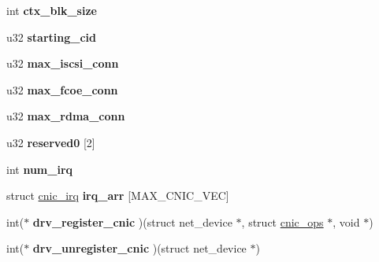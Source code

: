 \begin{DoxyCompactItemize}
\item 
\hypertarget{structcnic__eth__dev_a6cc08b64306a17888ab21e0898906372}{
int {\bfseries ctx\_\-blk\_\-size}}
\label{structcnic__eth__dev_a6cc08b64306a17888ab21e0898906372}

\item 
\hypertarget{structcnic__eth__dev_ada29383addcd6e47b8eb7660b0023e0b}{
u32 {\bfseries starting\_\-cid}}
\label{structcnic__eth__dev_ada29383addcd6e47b8eb7660b0023e0b}

\item 
\hypertarget{structcnic__eth__dev_a3b0c95fcc6e8b2b0db396239f2a8db26}{
u32 {\bfseries max\_\-iscsi\_\-conn}}
\label{structcnic__eth__dev_a3b0c95fcc6e8b2b0db396239f2a8db26}

\item 
\hypertarget{structcnic__eth__dev_a9dc0a53db604b6157ac246496273fb7d}{
u32 {\bfseries max\_\-fcoe\_\-conn}}
\label{structcnic__eth__dev_a9dc0a53db604b6157ac246496273fb7d}

\item 
\hypertarget{structcnic__eth__dev_a77a6c056d37112a0f83685d6c231c4eb}{
u32 {\bfseries max\_\-rdma\_\-conn}}
\label{structcnic__eth__dev_a77a6c056d37112a0f83685d6c231c4eb}

\item 
\hypertarget{structcnic__eth__dev_a4db0f8d66dc036f46839b0fec5dbe152}{
u32 {\bfseries reserved0} \mbox{[}2\mbox{]}}
\label{structcnic__eth__dev_a4db0f8d66dc036f46839b0fec5dbe152}

\item 
\hypertarget{structcnic__eth__dev_a839d8bc1c19f98b77a924e6d3402f71f}{
int {\bfseries num\_\-irq}}
\label{structcnic__eth__dev_a839d8bc1c19f98b77a924e6d3402f71f}

\item 
\hypertarget{structcnic__eth__dev_a7c4228d03b855d4073a110897f7a54b0}{
struct \hyperlink{structcnic__irq}{cnic\_\-irq} {\bfseries irq\_\-arr} \mbox{[}MAX\_\-CNIC\_\-VEC\mbox{]}}
\label{structcnic__eth__dev_a7c4228d03b855d4073a110897f7a54b0}

\item 
\hypertarget{structcnic__eth__dev_a8011d726c29bd4ac57f1737ea5c5facf}{
int($\ast$ {\bfseries drv\_\-register\_\-cnic} )(struct net\_\-device $\ast$, struct \hyperlink{structcnic__ops}{cnic\_\-ops} $\ast$, void $\ast$)}
\label{structcnic__eth__dev_a8011d726c29bd4ac57f1737ea5c5facf}

\item 
\hypertarget{structcnic__eth__dev_add6ce8c714d7fbc2a1a33fabb350f294}{
int($\ast$ {\bfseries drv\_\-unregister\_\-cnic} )(struct net\_\-device $\ast$)}
\label{structcnic__eth__dev_add6ce8c714d7fbc2a1a33fabb350f294}


\end{DoxyCompactItemize}
